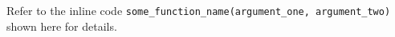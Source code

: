 Refer to the inline code \lstinline|some_function_name(argument_one, argument_two)| shown here for details.
